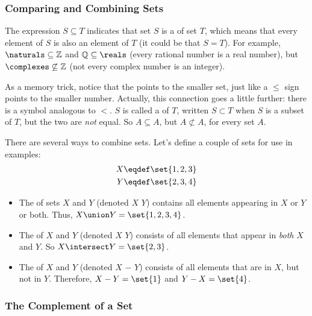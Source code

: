 \subsubsection{Comparing and Combining Sets}\label{subsubsec: subset}

The expression $S \subseteq T$ indicates that set $S$ is a 
of set $T$, which means that every element of $S$ is also an element of
$T$ (it could be that $S=T$).  For example, $\naturals \subseteq
\mathbb{Z}$ and $\mathbb{Q} \subseteq
\reals$ (every rational number is a real number), but $\complexes
\not\subseteq \mathbb{Z}$ (not every complex number is an integer).

As a memory trick, notice that the \term{$\subseteq$} points to the
smaller set, just like a $\leq$ sign points to the smaller number.
Actually, this connection goes a little further: there is a symbol
\term{$\subset$} analogous to $<$.  $S$ is called a   of $T$, written $S \subset T$ when $S$
is a subset of $T$, but the two are \emph{not} equal.  So $A \subseteq A$,
but $A \not\subset A$, for every set $A$.

There are several ways to combine sets.  Let's define a couple of sets for
use in examples:
\begin{align*}
X & \eqdef \set{1, 2, 3} \\
Y & \eqdef \set{2, 3, 4}
\end{align*}

\begin{itemize}

\item The  of sets $X$ and $Y$ (denoted $X$ \term{$\union$} $Y$)
contains all elements appearing in $X$ or $Y$ or both.  Thus, $X \union
Y = \set{1, 2, 3, 4}$.

\item The  of $X$ and $Y$ (denoted $X$
  \term{$\intersect$} $Y$) consists of all elements that appear in
  \emph{both} $X$ and $Y$.  So $X \intersect Y = \set{2, 3}$.

\item The  of $X$ and $Y$ (denoted $X$ $-$ $Y$) consists of all elements that are in $X$, but not in $Y$.
  Therefore, $X - Y = \set{1}$ and $Y - X = \set{4}$.

\end{itemize}

\subsubsection{The Complement of a Set}

